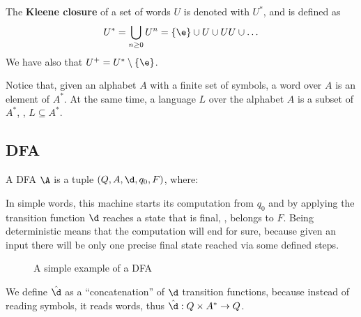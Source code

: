 \documentclass[oneside]{academica}
\begin{document}
\begin{definition*}
  The \textbf{Kleene closure} of a set of words $U$ is denoted with $U^*$, and is defined as
  \begin{equation}
    U^* = \bigcup_{n \ge 0} U^n = \left\{ \e \right\} \cup U \cup UU \cup \ldots
  \end{equation}
  We have also that $U^+ = U^* \setminus \left\{ \e \right\}$.
\end{definition*}

Notice that, given an alphabet $A$ with a finite set of symbols, a word over $A$ is an element of $A^*$.
At the same time, a language $L$ over the alphabet $A$ is a subset of $A^*$, \ie, $L \subseteq A^*$.

\subsection{DFA}

\begin{definition*}
  A DFA $\A$ is a tuple $\left( Q, A, \d, q_0, F \right)$, where:
\end{definition*}

In simple words, this machine starts its computation from $q_0$ and by applying the transition function $\d$ reaches a state that is final, \ie, belongs to $F$.
Being deterministic means that the computation will end for sure, because given an input there will be only one precise final state reached via some defined steps.

\vspace{-10pt}
\begin{figure}[H]
  \centering
  
  \caption{A simple example of a DFA}
\end{figure}

We define $\hat{\d}$ as a ``concatenation'' of $\d$ transition functions, because instead of reading symbols, it reads words, thus $\hat{\d}: Q \times A^* \to Q$.
\end{document}
